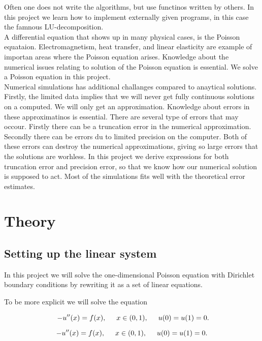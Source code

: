 \documentclass{article}
\begin{document}
Often one does not write the algorithms, but use functinos written by others. In this project we learn how to implement externally given programs, in this case the famnous LU-decomposition.\\

A differential equation that shows up in many physical cases, is the Poisson equataion. Electromagnetism, heat transfer, and linear elasticity are example of importan areas where the Poisson equation arises. Knowledge about the numerical issues relating to solution of the Poisson equation is essential. We solve a Poisson equation in this project. \\

Numerical simulations has additional challanges compared to anaytical solutions. Firstly, the limited data implies that we will never get fully continuous solutions on a computed. We will only get an approximation. Knowledge about errors in these approximatinos is essential. There are several type of errors that may occour. Firstly there can be a truncation error in the numerical approximation. Secondly there can be errors du to limited precision on the computer. Both of these errors can destroy the numerical approximations, giving so large errors that the solutions are worhless. In this project we derive expressions for both truncation error and precision error, so that we know how our numerical solution is supposed to act. Most of the simulations fits well with the theoretical error estimates.

\section{Theory}


\subsection{Setting up the linear system}
In this project we will solve the one-dimensional Poisson equation
with Dirichlet boundary conditions by rewriting it as a set of linear equations.


To be more explicit we will solve the equation

\begin{equation}\
-u''(x) = f(x), \hspace{0.5cm} x\in(0,1), \hspace{0.5cm} u(0) = u(1) = 0.
\end{equation}

\begin{equation}
-u''(x) = f(x), \hspace{0.5cm} x\in(0,1), \hspace{0.5cm} u(0) = u(1) = 0.
\label{eqn:diffEquation}
\end{equation}
\end{document}

